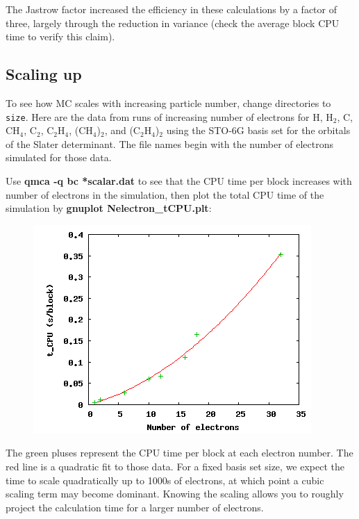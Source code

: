 The Jastrow factor increased the efficiency in these calculations by a factor
of three, largely through the reduction in variance (check the average block
CPU time to verify this claim).

\subsection{Scaling up}

To see how MC scales with increasing particle number, change directories to
\texttt{size}.  Here are the data from runs of increasing number of electrons
for H, H$_2$, C, CH$_4$, C$_2$, C$_2$H$_4$, (CH$_4$)$_2$, and (C$_2$H$_4$)$_2$
using the STO-6G basis set for the orbitals of the Slater determinant.  The file names begin with the number of electrons simulated for those data.

Use \textbf{qmca -q bc *scalar.dat} to see that the CPU time per block
increases with number of electrons in the simulation, then plot the total CPU
time of the simulation by \textbf{gnuplot Nelectron\_tCPU.plt}:

\FloatBarrier
\begin{figure}[ht!]
\begin{center}
\includegraphics[trim = 0mm 0mm 0mm 0mm, clip,width=0.75\columnwidth]{./figures/lab_qmc_statistics_scaling}
\end{center}
\end{figure}
\FloatBarrier


The green pluses represent the CPU time per block at each electron number.
The red line is a quadratic fit to those data.  For a fixed basis set size, we expect the time to scale quadratically up to 1000s of electrons, at which point a cubic scaling term may become dominant.  Knowing the scaling allows you to roughly project the calculation time for a larger number of electrons.

